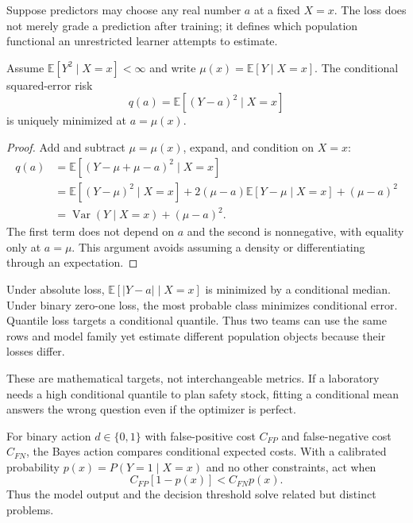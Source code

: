 Suppose predictors may choose any real number $a$ at a fixed $X=x$. The loss
does not merely grade a prediction after training; it defines which population
functional an unrestricted learner attempts to estimate.

\begin{theorem}
\label{thm:squared-loss-mean}
Assume $\mathbb{E}[Y^2\mid X=x]<\infty$ and write
$\mu(x)=\mathbb{E}[Y\mid X=x]$. The conditional squared-error risk
\[
q(a)=\mathbb{E}[(Y-a)^2\mid X=x]
\]
is uniquely minimized at $a=\mu(x)$.
\end{theorem}

\begin{proof}
Add and subtract $\mu=\mu(x)$, expand, and condition on $X=x$:
\begin{align*}
q(a)
&=\mathbb{E}[(Y-\mu+\mu-a)^2\mid X=x]\\
&=\mathbb{E}[(Y-\mu)^2\mid X=x]
  +2(\mu-a)\mathbb{E}[Y-\mu\mid X=x]+(\mu-a)^2\\
&=\operatorname{Var}(Y\mid X=x)+(\mu-a)^2.
\end{align*}
The first term does not depend on $a$ and the second is nonnegative, with
equality only at $a=\mu$. This argument avoids assuming a density or
differentiating through an expectation.
\end{proof}

Under absolute loss, $\mathbb{E}[|Y-a|\mid X=x]$ is minimized by a conditional
median. Under binary zero-one loss, the most probable class minimizes
conditional error. Quantile loss targets a conditional quantile. Thus two
teams can use the same rows and model family yet estimate different population
objects because their losses differ.

These are mathematical targets, not interchangeable metrics. If a laboratory
needs a high conditional quantile to plan safety stock, fitting a conditional
mean answers the wrong question even if the optimizer is perfect.

For binary action $d\in\{0,1\}$ with false-positive cost $C_{FP}$ and
false-negative cost $C_{FN}$, the Bayes action compares conditional expected
costs. With a calibrated probability $p(x)=P(Y=1\mid X=x)$ and no other
constraints, act when
\[
C_{FP}[1-p(x)]<C_{FN}p(x).
\]
Thus the model output and the decision threshold solve related but distinct
problems.


